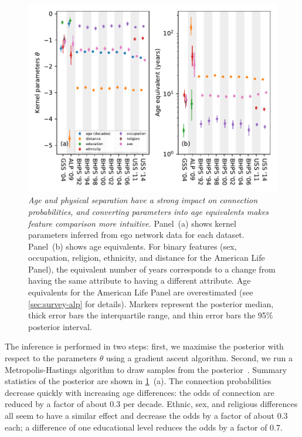 \documentclass{scrartcl}
\newcommand{\titlecaption}[2]{\caption[#1]{\emph{#1} #2}}
\begin{document}
\begin{refsection}
\begin{figure}
    \includegraphics{coefficients-age-equivalent}
    \titlecaption{Age and physical separation have a strong impact on connection probabilities, and converting parameters into age equivalents makes feature comparison more intuitive.}{
    Panel~(a) shows kernel parameters inferred from ego network data for each dataset.
    Panel~(b) shows age equivalents. For binary features (sex, occupation, religion, ethnicity, and distance for the American Life Panel), the equivalent number of years corresponds to a change from having the same attribute to having a different attribute. Age equivalents for the American Life Panel are overestimated (see \cref{sec:survey-alp} for details).
    Markers represent the posterior median, thick error bars the interquartile range, and thin error bars the 95\% posterior interval.\label{fig:parameters-and-age-equivalents}}
\end{figure}

The inference is performed in two steps: first, we maximise the posterior with respect to the parameters $\theta$ using a gradient ascent algorithm. Second, we run a Metropolis-Hastings algorithm to draw samples from the posterior~\cite{Hastings1970}. Summary statistics of the posterior are shown in \cref{fig:parameters-and-age-equivalents}~(a). The connection probabilities decrease quickly with increasing age differences: the odds of connection are reduced by a factor of about 0.3 per decade. Ethnic, sex, and religious differences all seem to have a similar effect and decrease the odds by a factor of about 0.3 each; a difference of one educational level reduces the odds by a factor of 0.7.


\end{refsection}
\end{document}
